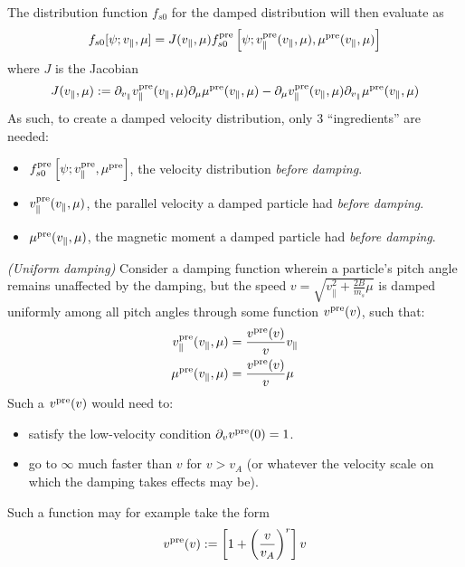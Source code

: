     The distribution function $f_{s0}$ for the damped distribution will then evaluate as
    \begin{equation}\label{damped distribution function}
        f_{s0}[\psi; v_{\parallel}, \mu]  =  J(v_{\parallel}, \mu)f_{s0}^{\rm pre}\left[\psi; v_{\parallel}^{\rm pre}(v_{\parallel}, \mu), \mu^{\rm pre}(v_{\parallel}, \mu)\right]
    \end{equation}
    where $J$ is the Jacobian
    \begin{equation}\label{Jacobian}
        J(v_{\parallel}, \mu)  :=  \partial_{v_{\parallel}}v_{\parallel}^{\rm pre}(v_{\parallel}, \mu)\partial_{\mu}\mu^{\rm pre}(v_{\parallel}, \mu) - \partial_{\mu}v_{\parallel}^{\rm pre}(v_{\parallel}, \mu)\partial_{v_{\parallel}}\mu^{\rm pre}(v_{\parallel}, \mu)
    \end{equation}
    As such, to create a damped velocity distribution, only 3 ``ingredients'' are needed:
    \begin{itemize}
        \item  $f_{s0}^{\rm pre}\left[\psi; v_{\parallel}^{\rm pre}, \mu^{\rm pre}\right]$, the velocity distribution \emph{before damping}.
        \item  $v_{\parallel}^{\rm pre}(v_{\parallel}, \mu)$, the parallel velocity a damped particle had \emph{before damping}.
        \item  $\mu^{\rm pre}(v_{\parallel}, \mu)$, the magnetic moment a damped particle had \emph{before damping}.
    \end{itemize}

    \begin{example}{\emph{(Uniform damping)}}
        Consider a damping function wherein a particle's pitch angle remains unaffected by the damping, but the speed $v = \sqrt{v_{\parallel}^{2} + \frac{2B}{m_{s}}\mu}$ is damped uniformly among all pitch angles through some function $v^{\rm pre}(v)$, such that:
        \begin{align}
           v_{\parallel}^{\rm pre}(v_{\parallel}, \mu)  &=  \frac{v^{\rm pre}(v)}{v}v_{\parallel}  \\
           \mu^{\rm pre}(v_{\parallel}, \mu)  &=  \frac{v^{\rm pre}(v)}{v}\mu
        \end{align}
        Such a $v^{\rm pre}(v)$ would need to:
        \begin{itemize}
            \item  satisfy the low-velocity condition $\partial_{v}v^{\rm pre}(0) = 1$.
            \item  go to $\infty$ much faster than $v$ for $v > v_{A}$ (or whatever the velocity scale on which the damping takes effects may be).
        \end{itemize}
        Such a function may for example take the form
        \begin{equation}
            v^{\rm pre}(v)  :=  \left[1 + \left(\frac{v}{v_{A}}\right)^{r}\right]v
        \end{equation}
    \end{example}
    